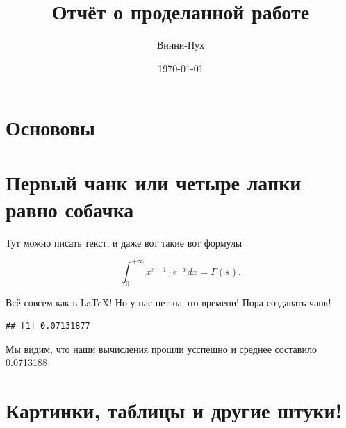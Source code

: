 \documentclass[12pt, a4paper]{article}
\title{Отчёт о проделанной работе}
\author{Винни-Пух}
\date{\today}
\begin{document}
\maketitle

\section{Основовы}




\section{Первый чанк или четыре лапки равно собачка}

Тут можно писать текст, и даже вот такие вот формулы

\[ \int_{0}^{+\infty} x^{s-1} \cdot e^{-x} dx = \Gamma(s). \]

Всё совсем как в \LaTeX! Но у нас нет на это времени! Пора создавать чанк!


\begin{knitrout}
\color{fgcolor}\begin{kframe}
\begin{alltt}
 \hlkwb{<-} \hlstd{(}\hlstd{)}
 \hlkwb{<-} 
\end{alltt}
\begin{verbatim}
## [1] 0.07131877
\end{verbatim}
\end{kframe}
\end{knitrout}

Мы видим, что наши вычисления прошли усспешно и среднее составило 0.0713188



\section{Картинки, таблицы и другие штуки!}

\begin{knitrout}
\color{fgcolor}\begin{kframe}


{\ttfamily\noindent\bfseries\color{errorcolor}{\#\# Error in curl::curl\_download(cu, tmp, handle = h): Could not resolve host: finance.yahoo.com}}

{\ttfamily\noindent\bfseries\color{errorcolor}{\#\# Error in time(GOOG): объект 'GOOG' не найден}}

{\ttfamily\noindent\bfseries\color{errorcolor}{\#\# Error in df[, -c(6, 7)]: объект типа 'closure' не делится на подгруппы}}\end{kframe}
\end{knitrout}
\end{document}

